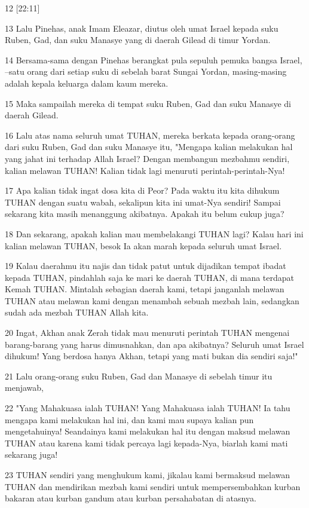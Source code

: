 \par 12 [22:11]
\par 13 Lalu Pinehas, anak Imam Eleazar, diutus oleh umat Israel kepada suku Ruben, Gad, dan suku Manasye yang di daerah Gilead di timur Yordan.
\par 14 Bersama-sama dengan Pinehas berangkat pula sepuluh pemuka bangsa Israel, --satu orang dari setiap suku di sebelah barat Sungai Yordan, masing-masing adalah kepala keluarga dalam kaum mereka.
\par 15 Maka sampailah mereka di tempat suku Ruben, Gad dan suku Manasye di daerah Gilead.
\par 16 Lalu atas nama seluruh umat TUHAN, mereka berkata kepada orang-orang dari suku Ruben, Gad dan suku Manasye itu, "Mengapa kalian melakukan hal yang jahat ini terhadap Allah Israel? Dengan membangun mezbahmu sendiri, kalian melawan TUHAN! Kalian tidak lagi menuruti perintah-perintah-Nya!
\par 17 Apa kalian tidak ingat dosa kita di Peor? Pada waktu itu kita dihukum TUHAN dengan suatu wabah, sekalipun kita ini umat-Nya sendiri! Sampai sekarang kita masih menanggung akibatnya. Apakah itu belum cukup juga?
\par 18 Dan sekarang, apakah kalian mau membelakangi TUHAN lagi? Kalau hari ini kalian melawan TUHAN, besok Ia akan marah kepada seluruh umat Israel.
\par 19 Kalau daerahmu itu najis dan tidak patut untuk dijadikan tempat ibadat kepada TUHAN, pindahlah saja ke mari ke daerah TUHAN, di mana terdapat Kemah TUHAN. Mintalah sebagian daerah kami, tetapi janganlah melawan TUHAN atau melawan kami dengan menambah sebuah mezbah lain, sedangkan sudah ada mezbah TUHAN Allah kita.
\par 20 Ingat, Akhan anak Zerah tidak mau menuruti perintah TUHAN mengenai barang-barang yang harus dimusnahkan, dan apa akibatnya? Seluruh umat Israel dihukum! Yang berdosa hanya Akhan, tetapi yang mati bukan dia sendiri saja!"
\par 21 Lalu orang-orang suku Ruben, Gad dan Manasye di sebelah timur itu menjawab,
\par 22 "Yang Mahakuasa ialah TUHAN! Yang Mahakuasa ialah TUHAN! Ia tahu mengapa kami melakukan hal ini, dan kami mau supaya kalian pun mengetahuinya! Seandainya kami melakukan hal itu dengan maksud melawan TUHAN atau karena kami tidak percaya lagi kepada-Nya, biarlah kami mati sekarang juga!
\par 23 TUHAN sendiri yang menghukum kami, jikalau kami bermaksud melawan TUHAN dan mendirikan mezbah kami sendiri untuk mempersembahkan kurban bakaran atau kurban gandum atau kurban persahabatan di atasnya.
